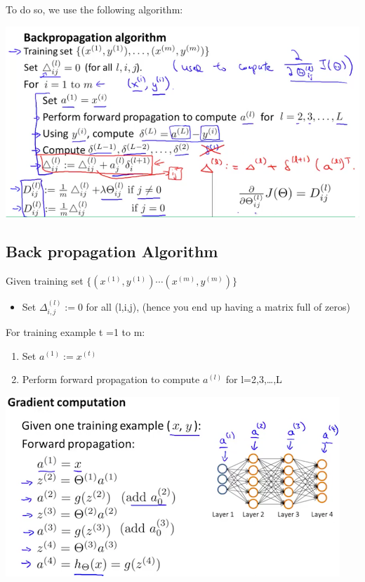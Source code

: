 \documentclass[
]{book}
\providecommand{\tightlist}{%
  \setlength{\itemsep}{0pt}\setlength{\parskip}{0pt}}
\begin{document}
To do so, we use the following algorithm:

\includegraphics{backpropagation.png}

\hypertarget{back-propagation-algorithm}{%
\subsection{Back propagation Algorithm}\label{back-propagation-algorithm}}

Given training set \(\lbrace (x^{(1)}, y^{(1)}) \cdots (x^{(m)}, y^{(m)})\rbrace\)

\begin{itemize}
\tightlist
\item
  Set \(\Delta^{(l)}_{i,j} := 0\) for all (l,i,j), (hence you end up having a matrix full of zeros)
\end{itemize}

For training example t =1 to m:

\begin{enumerate}
\def\labelenumi{\arabic{enumi}.}
\tightlist
\item
  Set \(a^{(1)} := x^{(t)}\)
\item
  Perform forward propagation to compute \(a^{(l)}\) for l=2,3,\ldots,L
\end{enumerate}

\includegraphics{backpropagation2.png}
\end{document}
